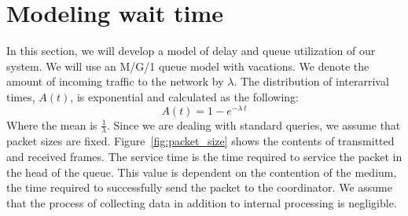 \section{Modeling wait time}\label{sec:model}

In this section, we will develop a model of delay and queue utilization of our system. We will use an M/G/1 queue model with vacations. We denote the amount of incoming traffic to the network by $\lambda$. The distribution of interarrival times, $A(t)$, is exponential and calculated as the following:
\begin{equation}
A(t) = 1 - e^{-\lambda\ t}
\end{equation}
Where the mean is $\frac{1}{\lambda}$. Since we are dealing with standard queries, we assume that packet sizes are fixed. Figure~\ref{fig:packet_size} shows the contents of transmitted and received frames. The service time is the time required to service the packet in the head of the queue. 
This value is dependent on the contention of the medium, the time required to successfully send the packet to the coordinator. We assume that the process of collecting data in addition to internal processing is negligible.

